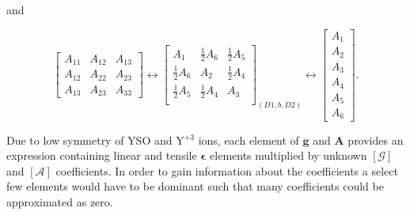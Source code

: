 and

\begin{equation}
\label{eq:Asimplified}
\begin{bmatrix}
A_{11} & A_{12} & A_{13} \\ 
A_{12} & A_{22}  & A_{23}\\ 
A_{13} & A_{23} & A_{33}
\end{bmatrix} \leftrightarrow 
\begin{bmatrix}
A_{1} & \frac{1}{2}A_{6} & \frac{1}{2}A_{5} \\ 
\frac{1}{2}A_{6} & A_{2}  & \frac{1}{2}A_{4}\\ 
\frac{1}{2}A_{5} & \frac{1}{2}A_{4} & A_{3} \\
\end{bmatrix}_{(D1,b,D2)} \leftrightarrow 
\begin{bmatrix}
A_{1}\\ 
A_{2}\\ 
A_{3}\\ 
A_{4}\\ 
A_{5}\\ 
A_{6}
\end{bmatrix}.
\end{equation}

Due to low symmetry of YSO and Y$^{+3}$ ions, each element of $\bm{g}$ and $\bm{A}$ provides an expression containing linear and tensile $\bm{\epsilon}$ elements multiplied by unknown $[\mathcal{G}]$ and $[\mathcal{A}]$ coefficients. In order to gain information about the coefficients a select few elements would have to be dominant such that many coefficients could be approximated as zero.



